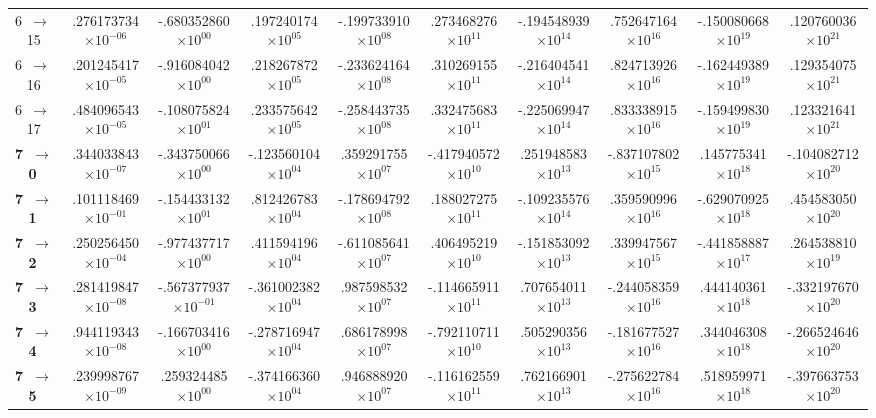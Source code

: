 \documentclass[reviewcopy]{elsarticle}
\begin{document}
\begin{landscape}
\begin{longtable}{lccccccccc}
 6~$\to$~ 15 &  .276173734$\times10^{-06}$ & -.680352860$\times10^{00}$ &  .197240174$\times10^{05}$ & -.199733910$\times10^{08}$ &  .273468276$\times10^{11}$ & -.194548939$\times10^{14}$ &  .752647164$\times10^{16}$ & -.150080668$\times10^{19}$ &  .120760036$\times10^{21}$ \\
 6~$\to$~ 16 &  .201245417$\times10^{-05}$ & -.916084042$\times10^{00}$ &  .218267872$\times10^{05}$ & -.233624164$\times10^{08}$ &  .310269155$\times10^{11}$ & -.216404541$\times10^{14}$ &  .824713926$\times10^{16}$ & -.162449389$\times10^{19}$ &  .129354075$\times10^{21}$ \\
 6~$\to$~ 17 &  .484096543$\times10^{-05}$ & -.108075824$\times10^{01}$ &  .233575642$\times10^{05}$ & -.258443735$\times10^{08}$ &  .332475683$\times10^{11}$ & -.225069947$\times10^{14}$ &  .833338915$\times10^{16}$ & -.159499830$\times10^{19}$ &  .123321641$\times10^{21}$ \\[7pt]
{\bf 7~$\to$~ 0}  &  .344033843$\times10^{-07}$ & -.343750066$\times10^{00}$ & -.123560104$\times10^{04}$ &  .359291755$\times10^{07}$ & -.417940572$\times10^{10}$ &  .251948583$\times10^{13}$ & -.837107802$\times10^{15}$ &  .145775341$\times10^{18}$ & -.104082712$\times10^{20}$ \\
{\bf 7~$\to$~ 1}  &  .101118469$\times10^{-01}$ & -.154433132$\times10^{01}$ &  .812426783$\times10^{04}$ & -.178694792$\times10^{08}$ &  .188027275$\times10^{11}$ & -.109235576$\times10^{14}$ &  .359590996$\times10^{16}$ & -.629070925$\times10^{18}$ &  .454583050$\times10^{20}$ \\
{\bf 7~$\to$~ 2}  &  .250256450$\times10^{-04}$ & -.977437717$\times10^{00}$ &  .411594196$\times10^{04}$ & -.611085641$\times10^{07}$ &  .406495219$\times10^{10}$ & -.151853092$\times10^{13}$ &  .339947567$\times10^{15}$ & -.441858887$\times10^{17}$ &  .264538810$\times10^{19}$ \\
{\bf 7~$\to$~ 3}  &  .281419847$\times10^{-08}$ & -.567377937$\times10^{-01}$ & -.361002382$\times10^{04}$ &  .987598532$\times10^{07}$ & -.114665911$\times10^{11}$ &  .707654011$\times10^{13}$ & -.244058359$\times10^{16}$ &  .444140361$\times10^{18}$ & -.332197670$\times10^{20}$ \\
{\bf 7~$\to$~ 4}  &  .944119343$\times10^{-08}$ & -.166703416$\times10^{00}$ & -.278716947$\times10^{04}$ &  .686178998$\times10^{07}$ & -.792110711$\times10^{10}$ &  .505290356$\times10^{13}$ & -.181677527$\times10^{16}$ &  .344046308$\times10^{18}$ & -.266524646$\times10^{20}$ \\
{\bf 7~$\to$~ 5}  &  .239998767$\times10^{-09}$ &  .259324485$\times10^{00}$ & -.374166360$\times10^{04}$ &  .946888920$\times10^{07}$ & -.116162559$\times10^{11}$ &  .762166901$\times10^{13}$ & -.275622784$\times10^{16}$ &  .518959971$\times10^{18}$ & -.397663753$\times10^{20}$ \\

\end{longtable}
\end{landscape}
\end{document}
